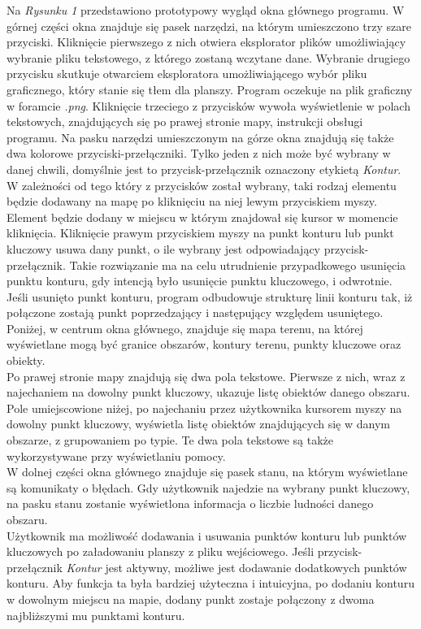 \documentclass[a4paper,12pt]{article}
\newcommand\tab[1][0.6cm]{\hspace*{#1} }
\begin{document}
\tab Na \textit{Rysunku 1} przedstawiono prototypowy wygląd okna głównego programu. W górnej części okna znajduje się pasek narzędzi, na którym umieszczono trzy szare przyciski. Kliknięcie pierwszego z nich otwiera eksplorator plików umożliwiający wybranie pliku tekstowego, z którego zostaną wczytane dane. Wybranie drugiego przycisku skutkuje otwarciem eksploratora umożliwiającego wybór pliku graficznego, który stanie się tłem dla planszy. Program oczekuje na plik graficzny w foramcie \textit{.png}. Kliknięcie trzeciego z przycisków wywoła wyświetlenie w polach tekstowych, znajdujących się po prawej stronie mapy, instrukcji obsługi programu. Na pasku narzędzi umieszczonym na górze okna znajdują się także dwa kolorowe przyciski-przełączniki. Tylko jeden z nich może być wybrany w danej chwili, domyślnie jest to przycisk-przełącznik oznaczony etykietą \textit{Kontur}.
W zależności od tego który z przycisków został wybrany, taki rodzaj elementu będzie dodawany na mapę po kliknięciu na niej lewym przyciskiem myszy. Element będzie dodany w miejscu w którym znajdował się kursor w momencie kliknięcia. Kliknięcie prawym przyciskiem myszy na punkt konturu lub punkt kluczowy usuwa dany punkt, o ile wybrany jest odpowiadający przycisk-przełącznik. Takie rozwiązanie ma na celu utrudnienie przypadkowego usunięcia punktu konturu, gdy intencją było usunięcie punktu kluczowego, i odwrotnie. Jeśli usunięto punkt konturu, program odbudowuje strukturę linii konturu tak, iż połączone zostają punkt poprzedzający i następujący względem usuniętego.
\\\tab Poniżej, w centrum okna głównego, znajduje się mapa terenu, na której wyświetlane mogą być granice obszarów, kontury terenu, punkty kluczowe oraz obiekty.
\\\tab Po prawej stronie mapy znajdują się dwa pola tekstowe. Pierwsze z nich, wraz z najechaniem na dowolny punkt kluczowy, ukazuje listę obiektów danego obszaru. Pole umiejscowione niżej, po najechaniu przez użytkownika kursorem myszy na dowolny punkt kluczowy, wyświetla listę obiektów znajdujących się w danym obszarze, z grupowaniem po typie. Te dwa pola tekstowe są także wykorzystywane przy wyświetlaniu pomocy.
\\\tab W dolnej części okna głównego znajduje się pasek stanu, na którym wyświetlane są komunikaty o błędach. Gdy użytkownik najedzie na wybrany punkt kluczowy, na pasku stanu zostanie wyświetlona informacja o liczbie ludności danego obszaru.
\\\tab Użytkownik ma możliwość dodawania i usuwania punktów konturu lub punktów kluczowych po załadowaniu planszy z pliku wejściowego. Jeśli przycisk-przełącznik \textit{Kontur} jest aktywny, możliwe jest dodawanie dodatkowych punktów konturu. Aby funkcja ta była bardziej użyteczna i intuicyjna, po dodaniu konturu w dowolnym miejscu na mapie, dodany punkt zostaje połączony z dwoma najbliższymi mu punktami konturu.
\end{document}
